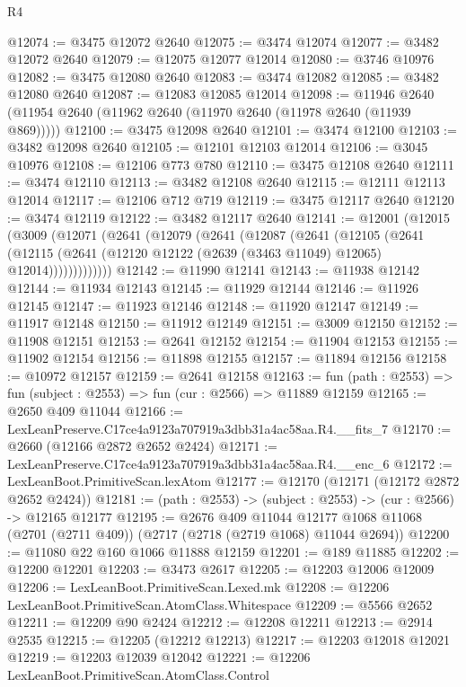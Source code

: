 \begin{lexlean}{R4}
\begin{coremodule}
@12074 := @3475 @12072 @2640
@12075 := @3474 @12074
@12077 := @3482 @12072 @2640
@12079 := @12075 @12077 @12014
@12080 := @3746 @10976
@12082 := @3475 @12080 @2640
@12083 := @3474 @12082
@12085 := @3482 @12080 @2640
@12087 := @12083 @12085 @12014
@12098 := @11946 @2640 (@11954 @2640 (@11962 @2640 (@11970 @2640 (@11978 @2640 (@11939 @869)))))
@12100 := @3475 @12098 @2640
@12101 := @3474 @12100
@12103 := @3482 @12098 @2640
@12105 := @12101 @12103 @12014
@12106 := @3045 @10976
@12108 := @12106 @773 @780
@12110 := @3475 @12108 @2640
@12111 := @3474 @12110
@12113 := @3482 @12108 @2640
@12115 := @12111 @12113 @12014
@12117 := @12106 @712 @719
@12119 := @3475 @12117 @2640
@12120 := @3474 @12119
@12122 := @3482 @12117 @2640
@12141 := @12001
    (@12015
      (@3009
        (@12071
          (@2641
            (@12079
              (@2641
                (@12087
                  (@2641
                    (@12105
                      (@2641
                        (@12115
                          (@2641 (@12120 @12122 (@2639 (@3463 @11049) @12065) @12014)))))))))))))
@12142 := @11990 @12141
@12143 := @11938 @12142
@12144 := @11934 @12143
@12145 := @11929 @12144
@12146 := @11926 @12145
@12147 := @11923 @12146
@12148 := @11920 @12147
@12149 := @11917 @12148
@12150 := @11912 @12149
@12151 := @3009 @12150
@12152 := @11908 @12151
@12153 := @2641 @12152
@12154 := @11904 @12153
@12155 := @11902 @12154
@12156 := @11898 @12155
@12157 := @11894 @12156
@12158 := @10972 @12157
@12159 := @2641 @12158
@12163 := fun (path : @2553) => fun (subject : @2553) => fun (cur : @2566) => @11889 @12159
@12165 := @2650 @409 @11044
@12166 := LexLeanPreserve.C17ce4a9123a707919a3dbb31a4ac58aa.R4.__fits_7
@12170 := @2660 (@12166 @2872 @2652 @2424)
@12171 := LexLeanPreserve.C17ce4a9123a707919a3dbb31a4ac58aa.R4.__enc_6
@12172 := LexLeanBoot.PrimitiveScan.lexAtom
@12177 := @12170 (@12171 (@12172 @2872 @2652 @2424))
@12181 := (path : @2553) -> (subject : @2553) -> (cur : @2566) -> @12165 @12177
@12195 := @2676
    @409
    @11044
    @12177
    @1068
    @11068
    (@2701 (@2711 @409))
    (@2717 (@2718 (@2719 @1068) @11044 @2694))
@12200 := @11080 @22 @160 @1066 @11888 @12159
@12201 := @189 @11885
@12202 := @12200 @12201
@12203 := @3473 @2617
@12205 := @12203 @12006 @12009
@12206 := LexLeanBoot.PrimitiveScan.Lexed.mk
@12208 := @12206 LexLeanBoot.PrimitiveScan.AtomClass.Whitespace
@12209 := @5566 @2652
@12211 := @12209 @90 @2424
@12212 := @12208 @12211
@12213 := @2914 @2535
@12215 := @12205 (@12212 @12213)
@12217 := @12203 @12018 @12021
@12219 := @12203 @12039 @12042
@12221 := @12206 LexLeanBoot.PrimitiveScan.AtomClass.Control

\end{coremodule}
\end{lexlean}
